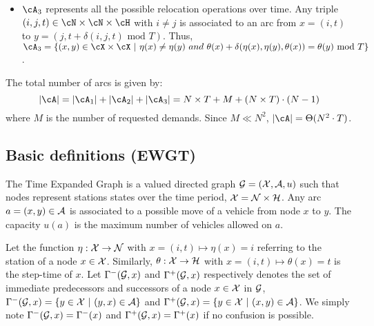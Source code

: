 \begin{bibunit}[ieeetr]
\begin{itemize}
\item 
${\cA}_3$ represents all the possible relocation operations over time.
Any triple $(i,j,t) \in \cN \times \cN \times \cH$ with $i \neq j$ is associated to an arc from $x = (i,t)$ to $y = (j, t + \delta(i,j,t) \mbox{ mod } T)$.
Thus, 
${\cA}_3 = \{(x,y) \in {\cX} \times {\cX} ~|~ \eta(x) \not= \eta(y) ~and~ \theta(x) + \delta(\eta(x), \eta(y), \theta(x)) = \theta(y)  \mbox{ mod } T\}$.
\end{itemize}
The total number of arcs is given by:
$$|{\cA}| = |{\cA}_1| + |{\cA}_2| + |{\cA}_3| = N \times T + M + (N \times T) \cdot (N - 1)$$
where $M$ is the number of requested demands. Since $M \ll N^2$, $|{\cA}| = \Theta(N^2\cdot T)$.

\subsection{Basic definitions (EWGT)}\label{subsec:basic}
The Time Expanded Graph is a valued directed graph ${\cal G}=({\cal X}, {\cal A}, u)$ such that
nodes represent stations states over the time period, \ie ${\cal X}={\cal N}\times {\cal H}$.
Any arc $a=(x,y)\in {\cal A}$ is associated to a possible move of a vehicle from node $x$ to $y$.
The capacity $u(a)$ is the maximum number of vehicles allowed on $a$.

Let the function $\eta:  {{\cal X}  \rightarrow  \cal N}$ with  $x=(i,t) \mapsto \eta(x)=i$ referring to 
the station of a node $x\in {\cal X}$. Similarly, 
$\theta: { {\cal X} \rightarrow  \cal H}$ with $x=(i,t) \mapsto \theta(x)=t$ is the step-time of $x$.
Let $\Gamma^-({\cal G}, x)$ and $\Gamma^+({\cal G},x)$ respectively denotes the set of immediate predecessors and successors of a node $x\in{\cal X}$ in ${\cal G}$, \ie
$\Gamma^-({\cal G}, x)=\{y\in{\cal X}~|~(y,x)\in{\cal A}\}$ and $\Gamma^+({\cal G},x)=\{y\in{\cal X}~|~(x,y)\in{\cal A}\}$.
We simply note $\Gamma^-({\cal G}, x)=\Gamma^-(x)$ and $\Gamma^+({\cal G}, x)=\Gamma^+(x)$ if no confusion is possible.


\end{bibunit}
